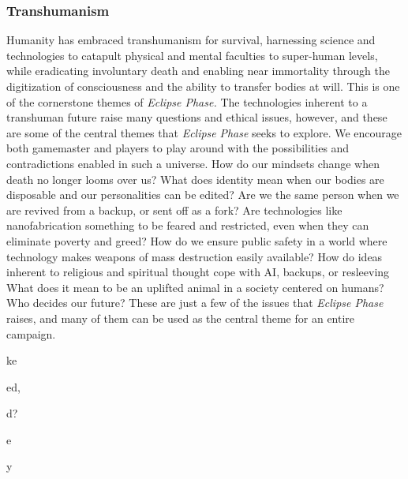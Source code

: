\subsubsection{Transhumanism}

Humanity has embraced transhumanism for survival, 
harnessing science and technologies to catapult physical
and mental faculties to super-human levels, while
eradicating involuntary death and enabling near immortality
through the digitization of consciousness
and the ability to transfer bodies at will. This is one of 
the cornerstone themes of \textit{Eclipse Phase.}
The technologies inherent to a transhuman future 
raise many questions and ethical issues, however, and 
these are some of the central themes that \textit{Eclipse }
\textit{Phase} seeks to explore. We encourage both gamemaster
and players to play around with the possibilities
and contradictions enabled in such a universe. How 
do our mindsets change when death no longer looms 
over us? What does identity mean when our bodies 
are disposable and our personalities can be edited? 
Are we the same person when we are revived from 
a backup, or sent off as a fork? Are technologies like 
nanofabrication something to be feared and restricted, 
even when they can eliminate poverty and greed? 
How do we ensure public safety in a world where 
technology makes weapons of mass destruction easily 
available? How do ideas inherent to religious and 
spiritual thought cope with AI, backups, or resleeving
What does it mean to be an uplifted animal in a
society centered on humans? Who decides our future? 
These are just a few of the issues that \textit{Eclipse Phase}
raises, and many of them can be used as the central 
theme for an entire campaign. 

ke

ed,

d?

e

y 
